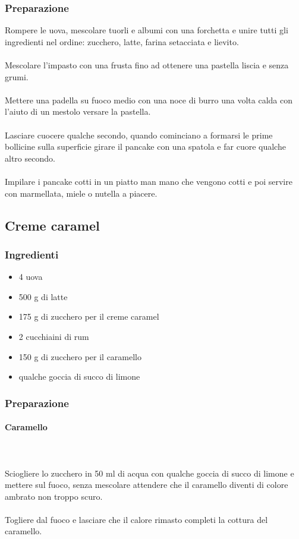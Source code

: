 \documentclass[12pt, a4paper]{article}
\begin{document}
\subsubsection{Preparazione}
	Rompere le uova, mescolare tuorli e albumi con una forchetta e unire
	tutti gli ingredienti nel ordine: zucchero, latte, farina setacciata 
	e lievito.\\\\
	Mescolare l'impasto con una frusta fino ad ottenere una pastella
	liscia e senza grumi.\\\\
	Mettere una padella su fuoco medio con una noce di burro una volta
	calda con l'aiuto di un mestolo versare la pastella.\\\\
	Lasciare cuocere qualche secondo, quando cominciano a formarsi 
	le prime bollicine sulla superficie girare il pancake con una spatola
	e far cuore qualche altro secondo.\\\\
	Impilare i pancake cotti in un piatto man mano che vengono cotti e poi
	servire con marmellata, miele o nutella a piacere.
\clearpage

\subsection{Creme caramel}

\subsubsection{Ingredienti}
\begin{itemize}
\item   4 uova
\item	500 g di latte
\item	175 g di zucchero per il creme caramel
\item	2 cucchiaini di rum
\item	150 g di zucchero per il caramello
\item	qualche goccia di succo di limone
\end{itemize}

\subsubsection{Preparazione}
	\paragraph{Caramello}\mbox{}\\\\
	Sciogliere lo zucchero in 50 ml di acqua con qualche goccia di succo di limone 
	e mettere sul fuoco, senza mescolare attendere che il caramello diventi di colore
	ambrato non troppo scuro.\\\\
	Togliere dal fuoco e lasciare che il calore rimasto 
	completi la cottura del caramello.
\end{document}
